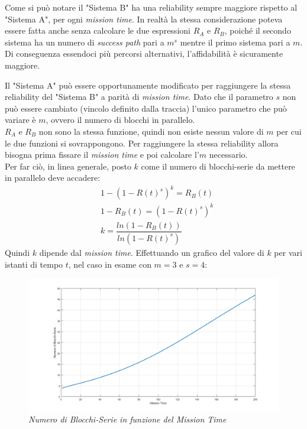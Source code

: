 Come si può notare il "Sistema B" ha una reliability sempre maggiore rispetto al "Sistema A", per ogni \textit{mission time}. In realtà la stessa considerazione poteva essere fatta anche senza calcolare le due espressioni $R_A$ e $R_B$, poiché il secondo sistema ha un numero di \textit{success path} pari a $m^s$ mentre il primo sistema pari a $m$. Di conseguenza essendoci più percorsi alternativi, l'affidabilità è sicuramente maggiore.

\vspace{0.5cm}
Il "Sistema A" può essere opportunamente modificato per raggiungere la stessa reliability del "Sistema B" a parità di \textit{mission time}. Dato che il parametro $s$ non può essere cambiato (vincolo definito dalla traccia) l'unico parametro che può variare è $m$, ovvero il numero di blocchi in parallelo. 
\\$R_A$ e $R_B$ non sono la stessa funzione, quindi non esiste nessun valore di $m$ per cui le due funzioni si sovrappongono. Per raggiungere la stessa reliability allora bisogna prima fissare il \textit{mission time} e poi calcolare l'$m$ necessario. \\Per far ciò, in linea generale, posto $k$ come il numero di blocchi-serie da mettere in parallelo deve accadere:
\begin{equation}
	\begin{split}
		&1-(1-R(t)^s)^k = R_B(t) \\
		&1-R_B(t) = (1-R(t)^s)^k \\
		&k = \dfrac{ln(1-R_B(t))}{ln(1-R(t)^s)} 
	\end{split}
\end{equation}
Quindi $k$ dipende dal \textit{mission time}. Effettuando un grafico del valore di $k$ per vari istanti di tempo $t$, nel caso in esame con $m=3$ e $s=4$:
\begin{figure}[H]
	\centering
	\includegraphics[width=\textwidth]{img/hw5/es2_grafico2.png}
	\caption{\textit{Numero di Blocchi-Serie in funzione del Mission Time}}
\end{figure}
